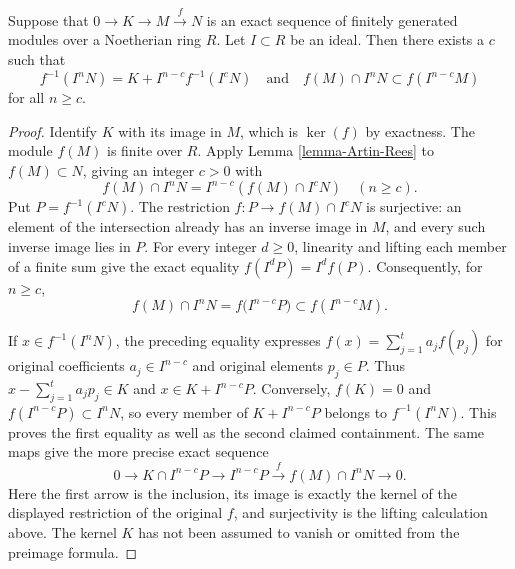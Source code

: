 \begin{lemma}
\label{lemma-map-AR}
Suppose that $0 \to K \to M \xrightarrow{f} N$ is an
exact sequence of finitely generated modules
over a Noetherian ring $R$. Let $I \subset R$ be an ideal.
Then there exists a $c$ such that
$$
f^{-1}(I^nN) = K + I^{n-c}f^{-1}(I^cN)
\quad\text{and}\quad
f(M) \cap I^nN \subset f(I^{n - c}M)
$$
for all $n \geq c$.
\end{lemma}

\begin{proof}
Identify $K$ with its image in $M$, which is $\ker(f)$ by
exactness. The module $f(M)$ is finite over $R$.
Apply Lemma \ref{lemma-Artin-Rees} to $f(M)\subset N$, giving
an integer $c>0$ with
$$
f(M)\cap I^nN=I^{n-c}(f(M)\cap I^cN)\quad(n\geq c).
$$
Put $P=f^{-1}(I^cN)$. The restriction $f:P\to f(M)\cap I^cN$
is surjective: an element of the intersection already has an
inverse image in $M$, and every such inverse image lies in $P$.
For every integer $d\geq0$, linearity and lifting each member
of a finite sum give the exact equality
$f(I^dP)=I^d f(P)$.
Consequently, for $n\geq c$,
$$
f(M)\cap I^nN
=f\bigl(I^{n-c}P\bigr)
\subset f(I^{n-c}M).
$$

If $x\in f^{-1}(I^nN)$, the preceding equality expresses
$f(x)=\sum_{j=1}^t a_jf(p_j)$ for original coefficients
$a_j\in I^{n-c}$ and original elements $p_j\in P$.
Thus $x-\sum_{j=1}^t a_jp_j\in K$ and
$x\in K+I^{n-c}P$. Conversely, $f(K)=0$ and
$f(I^{n-c}P)\subset I^nN$, so every member of
$K+I^{n-c}P$ belongs to $f^{-1}(I^nN)$. This proves the
first equality as well as the second claimed containment.
The same maps give the more precise exact sequence
$$
0\longrightarrow K\cap I^{n-c}P
\longrightarrow I^{n-c}P
\xrightarrow{\ f\ }f(M)\cap I^nN
\longrightarrow0.
$$
Here the first arrow is the inclusion, its image is exactly the
kernel of the displayed restriction of the original $f$, and
surjectivity is the lifting calculation above. The kernel $K$
has not been assumed to vanish or omitted from the preimage formula.
\end{proof}